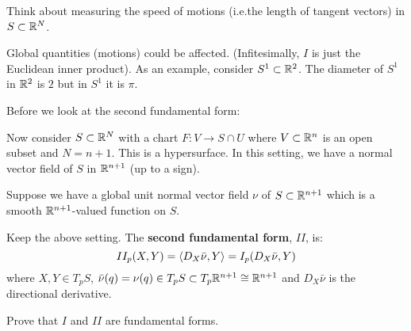 \begin{rmk}
  \lv
  \begin{enum}
    \io
    Think about measuring the speed of motions (i.e.\@ the length of tangent vectors) in $S \subset \mathbb{R}^N$.

    \io
    Global quantities (motions) could be affected.
    (Infitesimally, $I$ is just the Euclidean inner product).
    As an example, consider $S^1 \subset \mathbb{R}^2$.
    The diameter of $S^1$ in $\mathbb{R}^2$ is $2$ but in $S^1$ it is $\pi$.
  \end{enum}
\end{rmk}

Before we look at the second fundamental form:

Now consider $S \subset \mathbb{R}^N$ with a chart $F: V \to S \cap U$ where $V \subset \mathbb{R}^n$ is an open subset and $N=n+1$.
This is a hypersurface.
In this setting, we have a normal vector field of $S$ in $\mathbb{R}^{n+1}$ (up to a sign).

Suppose we have a global unit normal vector field $\nu$ of $S \subset \mathbb{R}^{n+1}$ which is a smooth $\mathbb{R}^{n+1}$-valued function on $S$.

\begin{defn}
  Keep the above setting.
  The \textbf{second fundamental form}, $II$, is:
  \[ II_p(X,Y) = {\left\langle D_X\bar\nu,Y \right\rangle} = I_p(D_X\bar\nu,Y) \]
  where $X,Y \in T_pS$, $\bar\nu(q) = \nu(q) \in T_pS \subset T_p\mathbb{R}^{n+1} \cong \mathbb{R}^{n+1}$ and $D_X\bar\nu$ is the directional derivative.
\end{defn}

\begin{exer}
  Prove that $I$ and $II$ are fundamental forms.
\end{exer}
